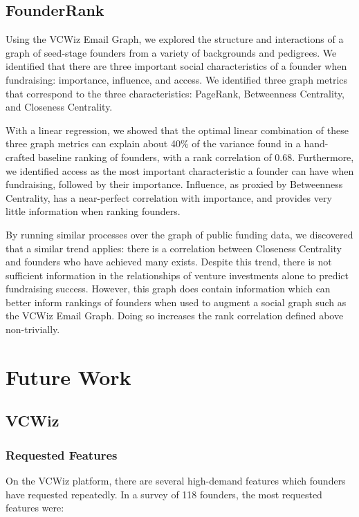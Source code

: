 \subsection{FounderRank}

Using the VCWiz Email Graph, we explored the structure and interactions of a graph of seed-stage founders from a variety of backgrounds and pedigrees. We identified that there are three important social characteristics of a founder when fundraising: importance, influence, and access. We identified three graph metrics that correspond to the three characteristics: PageRank, Betweenness Centrality, and Closeness Centrality.

With a linear regression, we showed that the optimal linear combination of these three graph metrics can explain about 40\% of the variance found in a hand-crafted baseline ranking of founders, with a rank correlation of $0.68$. Furthermore, we identified access as the most important characteristic a founder can have when fundraising, followed by their importance. Influence, as proxied by Betweenness Centrality, has a near-perfect correlation with importance, and provides very little information when ranking founders.

By running similar processes over the graph of public funding data, we discovered that a similar trend applies: there is a correlation between Closeness Centrality and founders who have achieved many exists. Despite this trend, there is not sufficient information in the relationships of venture investments alone to predict fundraising success. However, this graph does contain information which can better inform rankings of founders when used to augment a social graph such as the VCWiz Email Graph. Doing so increases the rank correlation defined above non-trivially.

\section{Future Work}

\subsection{VCWiz}

\subsubsection{Requested Features}

On the VCWiz platform, there are several high-demand features which founders have requested repeatedly. In a survey of 118 founders, the most requested features were:

